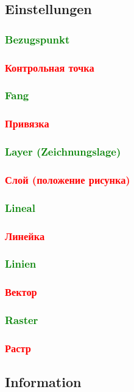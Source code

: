 \documentclass[14pt,a4paper]{book}
\newcommand{\DE}[1]{\textcolor{green}{#1}}
\newcommand{\RU}[1]{\textcolor{red}{#1}}
\begin{document}
		\subsection{Einstellungen}
			\DE{\subsubsection{Bezugspunkt}} 
			\RU{\subsubsection{Контрольная точка}} 
			\DE{\subsubsection{Fang}}
			\RU{\subsubsection{Привязка}}
 			\DE{\subsubsection{Layer (Zeichnungslage)}}
 			\RU{\subsubsection{Слой (положение рисунка)}} 
			\DE{\subsubsection{Lineal}}
			\RU{\subsubsection{Линейка}}
			\DE{\subsubsection{Linien}}
			\RU{\subsubsection{Вектор}}
			\DE{\subsubsection{Raster}}
			\RU{\subsubsection{Растр}}
		\subsection{Information}
\end{document}
